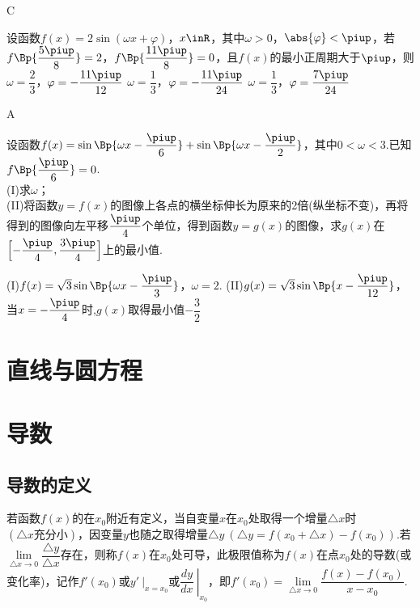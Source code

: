 \begin{exercise}
        \begin{answer}
          C
        \end{answer}
      \vspace{1.5em}
      \item%
            设函数$f(x)=2\sin(\omega x+\varphi)$，$x\inR$，其中$\omega>0$，$\abs{\varphi}<\piup$，若$f\Bp{\dfrac{5\piup}8}=2$，$f\Bp{\dfrac{11\piup}8}=0$，且$f(x)$的最小正周期大于$\piup$，则\xz
             {$\omega=\dfrac23$，$\varphi=-\dfrac{11\piup}{12}$}
             {$\omega=\dfrac13$，$\varphi=-\dfrac{11\piup}{24}$}
             {$\omega=\dfrac13$，$\varphi=\dfrac{7\piup}{24}$}
            \begin{answer}
              A
            \end{answer}
      \vspace{1.5em}
      \item%
            设函数$f(x)=\sin\Bp{\omega x-\dfrac{\piup}6}+\sin\Bp{\omega x-\dfrac{\piup}2}$，其中$0<\omega<3$.已知$f\Bp{\dfrac{\piup}6}=0$.\\
            (I)求$\omega$；\\
            (II)将函数$y=f(x)$的图像上各点的横坐标伸长为原来的2倍(纵坐标不变)，再将得到的图像向左平移$\dfrac{\piup}4$个单位，得到函数$y=g(x)$的图像，求$g(x)$在$\Bigl[-\dfrac{\piup}4,\dfrac{3\piup}4\Bigr]$上的最小值.
            \begin{answer}
              (I)$f(x)=\sqrt3\sin\Bp{\omega x-\dfrac{\piup}3}$，$\omega=2$.
              (II)$g(x)=\sqrt3\sin\Bp{x-\dfrac{\piup}{12}}$，当$x=-\dfrac{\piup}4$时,$g(x)$取得最小值$-\dfrac32$
            \end{answer}
      \vspace{5cm}
    \end{exercise}
\section{直线与圆方程}
\section{导数}
  \subsection{导数的定义}
    {\FCom 若函数$f(x)$的在$x_0$附近有定义，当自变量$x$在$x_0$处取得一个增量$ \triangle x $时$ (\triangle x\text{充分小}) $，因变量$ y $也随之取得增量$ \triangle y~\left(\triangle y=f(x_0+\triangle x)-f(x_0)\right). $若$ \lim\limits_{\triangle x \to 0}\dfrac{\triangle y}{\triangle x} $存在，则称$f(x)$在$x_0$处可导，此极限值称为$ f(x) $在点$x_0$处的导数(或变化率)，记作$ f'(x_0) $或$ \left.y'~\right|_{x=x_0} $或$\left.\dfrac{ dy}{dx }~\right|_{x_0}$，即$ f'(x_0)= \lim\limits_{\triangle x \to 0}\dfrac{f(x)-f(x_0)}{x-x_0}$.}
